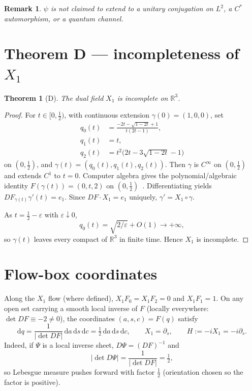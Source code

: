 ﻿\documentclass[11pt]{article}
\newtheorem{theorem}{Theorem}
\newtheorem{remark}{Remark}
\begin{document}
\begin{remark}
\(\psi\) is \emph{not} claimed to extend to a unitary conjugation on \(L^2\), a \(C^*\) automorphism, or a quantum channel.
\end{remark}

\section{Theorem D --- incompleteness of \texorpdfstring{\(X_1\)}{X1}}
\begin{theorem}[D]
The dual field \(X_1\) is incomplete on \(\mathbb{R}^3\).
\end{theorem}
\begin{proof}
For \(t\in[0,\tfrac12)\), with continuous extension \(\gamma(0)=(1,0,0)\), set
\begin{align*}
q_0(t)&=\frac{-2t-\sqrt{1-2t}+1}{t(2t-1)},\\
q_1(t)&=t,\\
q_2(t)&=t^2\bigl(2t-3\sqrt{1-2t}-1\bigr)
\end{align*}
on \((0,\tfrac12)\), and \(\gamma(t)=(q_0(t),q_1(t),q_2(t))\). Then \(\gamma\) is \(C^\infty\) on \((0,\tfrac12)\) and extends \(C^1\) to \(t=0\). Computer algebra gives the polynomial/algebraic identity \(F(\gamma(t))=(0,t,2)\) on \((0,\tfrac12)\)~\cite{FredriksenSoft}. Differentiating yields \(DF_{\gamma(t)}\gamma'(t)=e_1\). Since \(DF\cdot X_1=e_1\) uniquely, \(\gamma'=X_1\circ\gamma\).

As \(t=\tfrac12-\varepsilon\) with \(\varepsilon\downarrow 0\),
\[
q_0(t)=\sqrt{2/\varepsilon}+O(1)\to+\infty,
\]
so \(\gamma(t)\) leaves every compact of \(\mathbb{R}^3\) in finite time. Hence \(X_1\) is incomplete.
\end{proof}

\section{Flow-box coordinates}
Along the \(X_1\) flow (where defined), \(X_1 F_0=X_1 F_2=0\) and \(X_1 F_1=1\). On any open set carrying a smooth local inverse of \(F\) (locally everywhere: \(\det DF\equiv-2\neq 0\)), the coordinates \((a,s,c)=F(q)\) satisfy
\begingroup
\renewcommand*{\theHequation}{flowbox}
\begin{equation}
\mathrm{d}q
=\frac{1}{|\det DF|}\,\mathrm{d}a\,\mathrm{d}s\,\mathrm{d}c
=\tfrac12\,\mathrm{d}a\,\mathrm{d}s\,\mathrm{d}c,
\qquad
X_1=\partial_s,
\qquad
H:=-iX_1=-i\partial_s.
\tag{7.1}
\label{eq:flowbox}
\end{equation}
\endgroup
Indeed, if \(\Psi\) is a local inverse sheet, \(D\Psi=(DF)^{-1}\) and
\[
\bigl|\det D\Psi\bigr|
=\frac{1}{|\det DF|}=\tfrac12,
\]
so Lebesgue measure pushes forward with factor \(\tfrac12\) (orientation chosen so the factor is positive).
\end{document}
